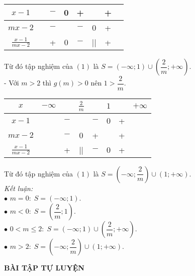 \begin{vd}
{\begin{center}
\begin{tabular}{|c|ccccccc|}
				\hline
				$x-1$             &           & $-$ &  0  &  +  &     & + &           \\
				\hline
				$mx-2$             &           & $-$ &     & $-$ &  0  & + &           \\
				\hline
				$\frac{x-1}{mx-2}$ &           &  +  &  0  & $-$ &  || & + &           \\
				\hline
			\end{tabular}
		\end{center}
		Từ đó tập nghiệm của $(1)$ là $S=\left(-\infty;1\right)\cup\left(\dfrac{2}{m};+\infty\right)$.\\
		- Với $m>2$ thì $g(m)>0$ nên $1>\dfrac{2}{m}$.
		\begin{center}
			\begin{tabular}{|c|ccccccc|}
				\hline
				$x$                & $-\infty$ &     & $\frac{2}{m}$ &     & $1$ &   & $+\infty$ \\
				\hline
				$x-1$              &           & $-$ &               & $-$ &  0  & + &           \\
				\hline
				$mx-2$            &           & $-$ &       0       &  +  &     & + &           \\
				\hline
				$\frac{x-1}{mx-2}$ &           &  +  &       ||      & $-$ &  0  & + &           \\
				\hline
			\end{tabular}
		\end{center}
		Từ đó tập nghiệm của $(1)$ là $S=\left(-\infty;\dfrac{2}{m}\right)\cup\left(1;+\infty\right)$.\\
		\textit{Kết luận:}\\
		$\bullet$ $m=0:\; S=\left(-\infty;1\right)$.\\
		$\bullet$ $m<0:\; S=\left(\dfrac{2}{m};1\right)$.\\
		$\bullet$ $0<m\leq 2:\; S=\left(-\infty;1\right)\cup\left(\dfrac{2}{m};+\infty\right)$.\\
		$\bullet$ $m>2:\; S=\left(-\infty;\dfrac{2}{m}\right)\cup\left(1;+\infty\right)$.
	}
	
\end{vd}
\begin{center}
	\textbf{BÀI TẬP TỰ LUYỆN}
\end{center}
